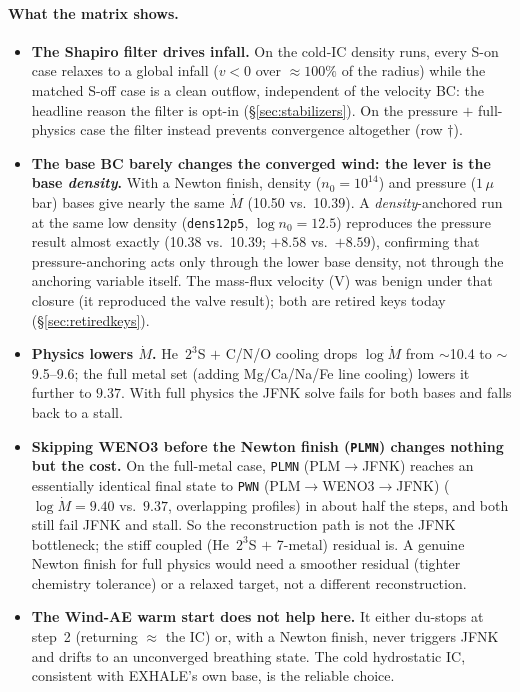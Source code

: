 \documentclass[english,a4paper]{my_memo}
\begin{document}
\paragraph{What the matrix shows.}
\begin{itemize}
\item \textbf{The Shapiro filter drives infall.} On the cold-IC density runs,
  every S-on case relaxes to a global infall ($v<0$ over $\approx100\%$ of the
  radius) while
  the matched S-off case is a clean outflow, independent of the velocity BC:
  the headline reason the filter is opt-in (\S\ref{sec:stabilizers}). On the
  pressure $+$ full-physics case the filter instead prevents convergence
  altogether (row $\dagger$).
\item \textbf{The base BC barely changes the converged wind: the lever is the
  base \emph{density}.} With a Newton finish, density ($n_0=10^{14}$) and
  pressure ($1\,\mu$bar) bases give nearly the same $\dot M$ (10.50 vs.\ 10.39).
  A \emph{density}-anchored run at the same low density (\texttt{dens12p5},
  $\log n_0 = 12.5$) reproduces the pressure result almost exactly (10.38 vs.\
  10.39; $+8.58$ vs.\ $+8.59$), confirming that pressure-anchoring acts only
  through the lower base density, not through the anchoring variable itself.
  The mass-flux velocity (V) was benign under that closure (it reproduced
  the valve result); both are retired keys today (\S\ref{sec:retiredkeys}).
\item \textbf{Physics lowers $\dot M$.} He~$2^3$S $+$ C/N/O cooling drops
  $\log\dot M$ from $\sim$10.4 to $\sim$9.5--9.6; the full metal set
  (adding Mg/Ca/Na/Fe line cooling) lowers it further to $9.37$. With full
  physics the JFNK solve fails for both bases and falls back to a stall.
\item \textbf{Skipping WENO3 before the Newton finish (\texttt{PLMN}) changes
  nothing but the cost.} On the full-metal case, \texttt{PLMN} (PLM$\to$JFNK)
  reaches an essentially identical final state to \texttt{PWN}
  (PLM$\to$WENO3$\to$JFNK) ($\log\dot M = 9.40$ vs.\ $9.37$, overlapping
  profiles) in about half the steps, and both still fail JFNK and stall. So
  the reconstruction path is not the JFNK bottleneck; the stiff coupled
  (He~$2^3$S $+$ 7-metal) residual is. A genuine Newton finish for full physics
  would need a smoother residual (tighter chemistry tolerance) or a relaxed
  target, not a different reconstruction.
\item \textbf{The Wind-AE warm start does not help here.} It either du-stops at
  step~2 (returning $\approx$ the IC) or, with a Newton finish, never triggers
  JFNK and drifts to an unconverged breathing state. The cold hydrostatic IC,
  consistent with EXHALE's own base, is the reliable choice.
\end{itemize}
\end{document}
